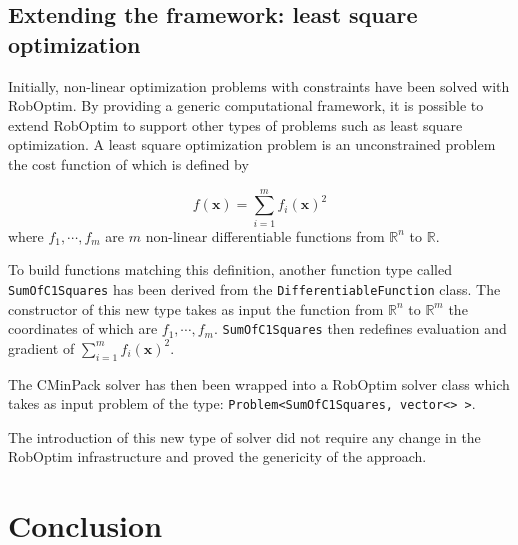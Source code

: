 \documentclass[conference,final,a4paper,twocolumn,9pt]{IEEEtran}
\begin{document}
\subsection{Extending the framework: least square optimization}


Initially, non-linear optimization problems with constraints have been
solved with RobOptim. By providing a generic computational framework,
it is possible to extend RobOptim to support other types of problems
such as least square optimization. A least square optimization problem is an
unconstrained problem the cost function of which is defined by

\begin{equation}
  f(\mathbf{x}) = \sum_{i=1}^m f_i (\mathbf{x})^2
\end{equation}
where $f_1,\cdots,f_m$ are $m$ non-linear differentiable functions from $\mathbb{R}^n$ to $\mathbb{R}$.

To build functions matching this definition, another function type
called \texttt{SumOfC1Squares} has been derived from the
\texttt{DifferentiableFunction} class. The constructor of this new type takes
as input the function from $\mathbb{R}^n$ to $\mathbb{R}^m$ the coordinates of
which are $f_1,\cdots,f_m$. \texttt{SumOfC1Squares} then redefines evaluation
and gradient of $\sum_{i=1}^m f_i (\mathbf{x})^2$.

The CMinPack solver has then
been wrapped into a RobOptim solver class which takes as input problem
of the type: \texttt{Problem<SumOfC1Squares, vector<> >}.

The introduction of this new type of solver did not require any change
in the RobOptim infrastructure and proved the genericity of the
approach.


\section{Conclusion}\label{sec:conclusion}
\end{document}
